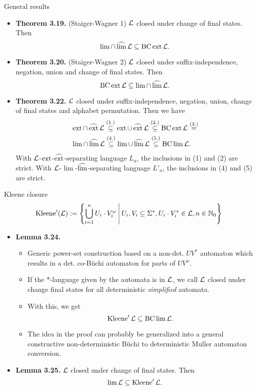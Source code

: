 \documentclass[
	handout,
	notheorems,noamsthm]{beamer}
\begin{document}
\begin{frame}[<+->]{General results}
\begin{itemize}
\item \textbf{Theorem 3.19.} (Staiger-Wagner 1) $\mathcal{L}$ closed under change of final states. Then
\[ \lim \cap \operatorname{\widehat{lim}} \mathcal{L} \subseteq \operatorname{BC} \operatorname{ext} \mathcal{L} . \]
\item \textbf{Theorem 3.20.} (Staiger-Wagner 2) $\mathcal{L}$ closed under suffix-independence, negation, union and change of final states. Then
\[ \operatorname{BC} \operatorname{ext} \mathcal{L} \subseteq \lim \cap \operatorname{\widehat{lim}} \mathcal{L} . \]
\item \textbf{Theorem 3.22.} $\mathcal{L}$ closed under suffix-independence, negation, union, change of final states and alphabet permutation.
Then we have
\begin{align*}
& \operatorname{ext} \cap \operatorname{\widehat{ext}} \mathcal{L} \stackrel{(1.)}\subseteq
\operatorname{ext} \cup \operatorname{\widehat{ext}} \mathcal{L} \stackrel{(2.)}\subseteq
\operatorname{BC} \operatorname{ext} \mathcal{L} \stackrel{(3.)}= \\
& \lim \cap \operatorname{\widehat{lim}} \mathcal{L} \stackrel{(4.)}\subseteq
\lim \cup \operatorname{\widehat{lim}} \mathcal{L} \stackrel{(5.)}\subseteq
\operatorname{BC} \lim \mathcal{L} .
\end{align*}
With $\mathcal{L}$-$\operatorname{ext}$-$\operatorname{\widehat{ext}}$-separating language $L_a$, the inclusions in (1) and (2) are strict.
With $\mathcal{L}$-$\lim$-$\operatorname{\widehat{lim}}$-separating language $L'_a$, the inclusions in (4) and (5) are strict.\end{itemize}
\end{frame}

\begin{frame}[<+->]{Kleene closure}
\[ \Kleene'(\Lang) := \Set{ \bigcup_{i=1}^n U_i \cdot V_i^\omega}{U_i, V_i \subseteq \Sigma^*, U_i \cdot V_i^* \in \Lang, n \in \N_0} \]

\begin{itemize}
\item \textbf{Lemma 3.24.}
\begin{itemize}
\item Generic power-set construction based on a non-det. $U V^*$ automaton which results in a det. co-Büchi automaton for parts of $U V^\omega$.
\item If the $*$-language given by the automata is in $\mathcal{L}$, we call $\mathcal{L}$ closed under change final states for all deterministic \emph{simplified} automata.
\item With this, we get
\[ \operatorname{Kleene}' \mathcal{L} \subseteq \operatorname{BC} \lim \mathcal{L} . \]
\item The idea in the proof can probably be generalized into a general constructive non-deterministic Büchi to deterministic Muller automaton conversion.
\end{itemize}

\item \textbf{Lemma 3.25.} $\mathcal{L}$ closed under change of final states. Then
\[ \lim \mathcal{L} \subseteq \operatorname{Kleene}' \mathcal{L} . \]
\end{itemize}
\end{frame}
\end{document}
